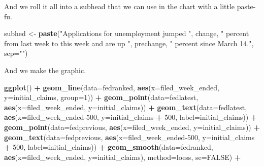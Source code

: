 \documentclass[]{book}
\newenvironment{Shaded}{\begin{snugshade}}{\end{snugshade}}
\newcommand{\DataTypeTok}[1]{\textcolor[rgb]{0.13,0.29,0.53}{#1}}
\newcommand{\DecValTok}[1]{\textcolor[rgb]{0.00,0.00,0.81}{#1}}
\newcommand{\KeywordTok}[1]{\textcolor[rgb]{0.13,0.29,0.53}{\textbf{#1}}}
\newcommand{\NormalTok}[1]{#1}
\newcommand{\OperatorTok}[1]{\textcolor[rgb]{0.81,0.36,0.00}{\textbf{#1}}}
\newcommand{\OtherTok}[1]{\textcolor[rgb]{0.56,0.35,0.01}{#1}}
\newcommand{\StringTok}[1]{\textcolor[rgb]{0.31,0.60,0.02}{#1}}
\begin{document}
And we roll it all into a subhead that we can use in the chart with a little paste-fu.

\begin{Shaded}
\begin{Highlighting}[]
\NormalTok{subhed <-}\StringTok{ }\KeywordTok{paste}\NormalTok{(}\StringTok{"Applications for unemployment jumped "}\NormalTok{, change, }\StringTok{" percent from last week to this week and are up "}\NormalTok{, prechange, }\StringTok{" percent since March 14."}\NormalTok{, }\DataTypeTok{sep=}\StringTok{""}\NormalTok{)}
\end{Highlighting}
\end{Shaded}

And we make the graphic.

\begin{Shaded}
\begin{Highlighting}[]
\KeywordTok{ggplot}\NormalTok{() }\OperatorTok{+}\StringTok{ }
\StringTok{  }\KeywordTok{geom_line}\NormalTok{(}\DataTypeTok{data=}\NormalTok{fedranked, }\KeywordTok{aes}\NormalTok{(}\DataTypeTok{x=}\NormalTok{filed_week_ended, }\DataTypeTok{y=}\NormalTok{initial_claims, }\DataTypeTok{group=}\DecValTok{1}\NormalTok{)) }\OperatorTok{+}
\StringTok{  }\KeywordTok{geom_point}\NormalTok{(}\DataTypeTok{data=}\NormalTok{fedlatest, }\KeywordTok{aes}\NormalTok{(}\DataTypeTok{x=}\NormalTok{filed_week_ended, }\DataTypeTok{y=}\NormalTok{initial_claims)) }\OperatorTok{+}\StringTok{ }
\StringTok{  }\KeywordTok{geom_text}\NormalTok{(}\DataTypeTok{data=}\NormalTok{fedlatest, }\KeywordTok{aes}\NormalTok{(}\DataTypeTok{x=}\NormalTok{filed_week_ended}\DecValTok{-500}\NormalTok{, }\DataTypeTok{y=}\NormalTok{initial_claims }\OperatorTok{+}\StringTok{ }\DecValTok{500}\NormalTok{, }\DataTypeTok{label=}\NormalTok{initial_claims)) }\OperatorTok{+}\StringTok{ }
\StringTok{  }\KeywordTok{geom_point}\NormalTok{(}\DataTypeTok{data=}\NormalTok{fedprevious, }\KeywordTok{aes}\NormalTok{(}\DataTypeTok{x=}\NormalTok{filed_week_ended, }\DataTypeTok{y=}\NormalTok{initial_claims)) }\OperatorTok{+}\StringTok{ }
\StringTok{  }\KeywordTok{geom_text}\NormalTok{(}\DataTypeTok{data=}\NormalTok{fedprevious, }\KeywordTok{aes}\NormalTok{(}\DataTypeTok{x=}\NormalTok{filed_week_ended}\DecValTok{-500}\NormalTok{, }\DataTypeTok{y=}\NormalTok{initial_claims }\OperatorTok{+}\StringTok{ }\DecValTok{500}\NormalTok{, }\DataTypeTok{label=}\NormalTok{initial_claims)) }\OperatorTok{+}\StringTok{ }
\StringTok{  }\KeywordTok{geom_smooth}\NormalTok{(}\DataTypeTok{data=}\NormalTok{fedranked, }\KeywordTok{aes}\NormalTok{(}\DataTypeTok{x=}\NormalTok{filed_week_ended, }\DataTypeTok{y=}\NormalTok{initial_claims), }\DataTypeTok{method=}\NormalTok{loess, }\DataTypeTok{se=}\OtherTok{FALSE}\NormalTok{) }\OperatorTok{+}\StringTok{ }

\end{Highlighting}
\end{Shaded}
\end{document}
